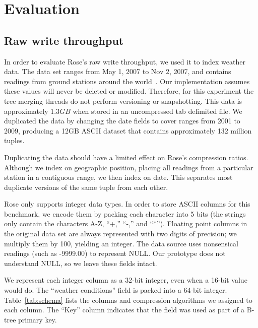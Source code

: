 \documentclass{vldb}
\newcommand{\rows}{Rose\xspace}
\newcommand{\rowss}{Rose's\xspace}
\begin{document}
\section{Evaluation}

\subsection{Raw write throughput}

In order to evaluate \rowss raw write throughput, we used it to index
weather data.  The data set ranges from May 1,
2007 to Nov 2, 2007, and contains readings from ground stations around
the world~\cite{nssl}.  Our implementation assumes these values will never be deleted or modified.  Therefore, for this experiment the tree merging threads do not perform versioning or snapshotting.  This data is approximately $1.3GB$ when stored in an
uncompressed tab delimited file.  We duplicated the data by changing
the date fields to cover ranges from 2001 to 2009, producing a 12GB
ASCII dataset that contains approximately 132 million tuples.

Duplicating the data should have a limited effect on \rowss
compression ratios.  Although we index on geographic position, placing
all readings from a particular station in a contiguous range, we then
index on date.  This separates most duplicate versions of the same tuple
from each other.

\rows only supports integer data types.  In order to store ASCII columns for this benchmark, we encode them
by packing each character into 5 bits (the strings only
contain the characters A-Z, ``+,'' ``-,'' and ``*'').  Floating point columns in
the original data set are always represented with two digits of precision;
we multiply them by 100, yielding an integer.  The data source uses
nonsensical readings (such as -9999.00) to represent NULL.  Our
prototype does not understand NULL, so we leave these fields intact.

We represent each integer column as a 32-bit integer, even when a 16-bit value
would do.  The ``weather conditions'' field is packed into a
64-bit integer.  Table~\ref{tab:schema} lists the columns and
compression algorithms we assigned to each column.  The ``Key'' column indicates
that the field was used as part of a B-tree primary key.
\end{document}
